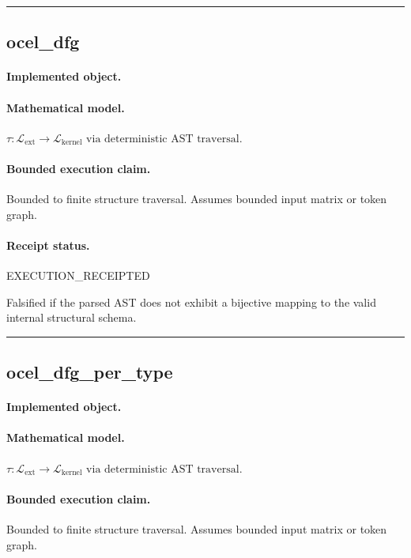 \vspace{1em}\hrule\vspace{1em}
\subsection{ocel\_dfg}
\paragraph{Implemented object.} 
\paragraph{Mathematical model.} $\tau : \mathcal{L}_{\text{ext}} \to \mathcal{L}_{\text{kernel}} \text{ via deterministic AST traversal}.$
\paragraph{Bounded execution claim.} Bounded to finite structure traversal. Assumes bounded input matrix or token graph.
\paragraph{Receipt status.} EXECUTION\_RECEIPTED
\begin{falsifier}
Falsified if the parsed AST does not exhibit a bijective mapping to the valid internal structural schema.
\end{falsifier}

\vspace{1em}\hrule\vspace{1em}
\subsection{ocel\_dfg\_per\_type}
\paragraph{Implemented object.} 
\paragraph{Mathematical model.} $\tau : \mathcal{L}_{\text{ext}} \to \mathcal{L}_{\text{kernel}} \text{ via deterministic AST traversal}.$
\paragraph{Bounded execution claim.} Bounded to finite structure traversal. Assumes bounded input matrix or token graph.
